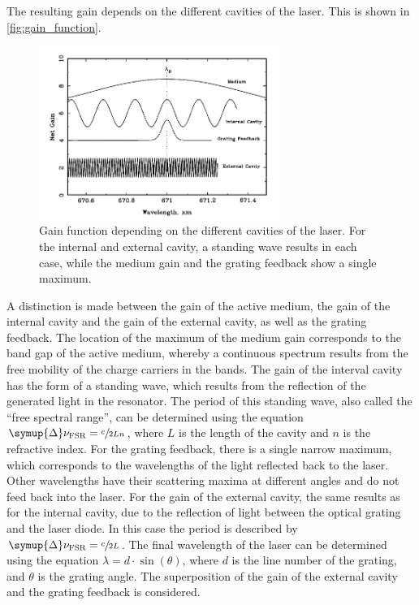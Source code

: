 The resulting gain depends on the different cavities of the laser.
This is shown in \autoref{fig:gain_function}.
\begin{figure}
    \centering
    \includegraphics[width=0.7\textwidth]{content/img/p9_Fig5.png}
    \caption{
        Gain function depending on the different cavities of the laser.
        For the internal and external cavity,
        a standing wave results in each case,
        while the medium gain and the grating feedback show a single maximum.
        \cite{versuchsanleitung}
    }
    \label{fig:gain_function}
\end{figure}
A distinction is made between the gain of the active medium,
the gain of the internal cavity and the gain of the external cavity,
as well as the grating feedback.
The location of the maximum of the medium gain corresponds to the band gap of the active medium,
whereby a continuous spectrum results from the free mobility of the charge carriers in the bands.
The gain of the interval cavity has the form of a standing wave,
which results from the reflection of the generated light in the resonator.
The period of this standing wave,
also called the \enquote{free spectral range},
can be determined using the equation $\symup{\Delta}\nu_\text{FSR} = \sfrac{c}{2Ln}$,
where $L$ is the length of the cavity and $n$ is the refractive index.
For the grating feedback, there is a single narrow maximum,
which corresponds to the wavelengths of the light reflected back to the laser.
Other wavelengths have their scattering maxima at different angles and do not feed back into the laser.
For the gain of the external cavity, the same results as for the internal cavity,
due to the reflection of light between the optical grating and the laser diode.
In this case the period is described by $\symup{\Delta}\nu_\text{FSR} = \sfrac{c}{2L}$.
The final wavelength of the laser can be determined using the equation $\lambda = d \cdot \sin{(\theta)}$,
where $d$ is the line number of the grating,
and $\theta$ is the grating angle.
The superposition of the gain of the external cavity and the grating feedback is considered.

